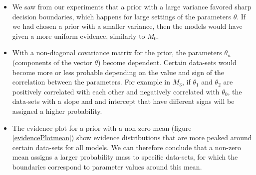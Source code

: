 \documentclass[a4paper,11pt]{article}
\theoremstyle{mytheor}
\begin{document}
\begin{itemize}
\item We saw from our experiments that a prior with a large variance favored sharp decision boundaries, which happens for large settings of the parameters $\theta$. If we had chosen a prior with a smaller variance, then the models would have given a more uniform evidence, similarly to $M_0$.
\item With a non-diagonal covariance matrix for the prior, the parameters $\theta_n$ (components of the vector $\theta$) become dependent. Certain data-sets would become more or less probable depending on the value and sign of the correlation between the parameters. For example in $M_3$, if $\theta_1$ and $\theta_2$ are positively correlated with each other and negatively correlated with $\theta_0$, the data-sets with a slope and and intercept that have different signs will be assigned a higher probability.
\item The evidence plot for a prior with a non-zero mean (figure \ref{evidencePlotmean}) show evidence distributions that are more peaked around certain data-sets for all models. We can therefore conclude that a non-zero mean assigns a larger probability mass to specific data-sets, for which the boundaries correspond to parameter values around this mean.
\end{itemize}
\end{document}
